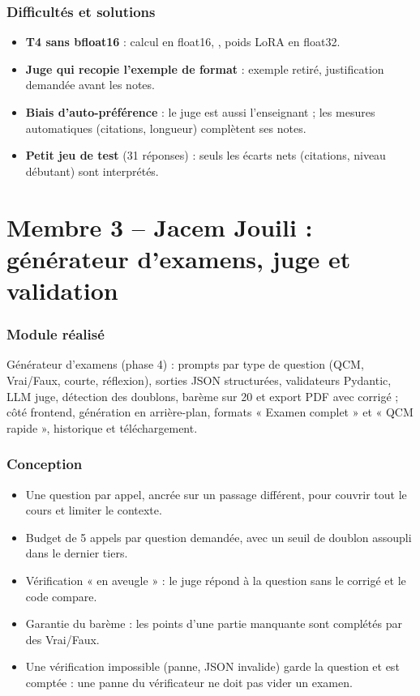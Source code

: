 \documentclass[12pt,a4paper]{report}
\newcommand{\membreTrois}{Jacem Jouili}
\DeclareRobustCommand{\code}[1]{\texttt{\codecasse{#1}}}
\begin{document}
\subsubsection{Difficultés et solutions}
\begin{itemize}
  \item \textbf{T4 sans bfloat16} : calcul en float16, \code{bf16=False}, poids LoRA en float32.
  \item \textbf{Juge qui recopie l'exemple de format} : exemple retiré, justification demandée avant les
        notes.
  \item \textbf{Biais d'auto-préférence} : le juge est aussi l'enseignant ; les mesures automatiques
        (citations, longueur) complètent ses notes.
  \item \textbf{Petit jeu de test} (31 réponses) : seuls les écarts nets (citations, niveau débutant) sont
        interprétés.
\end{itemize}

\section{Membre 3 -- \membreTrois{} : générateur d'examens, juge et validation}
\label{sec:contrib-m3}

\subsubsection{Module réalisé}
Générateur d'examens (phase 4) : prompts par type de question (QCM, Vrai/Faux, courte, réflexion),
sorties JSON structurées, validateurs Pydantic, LLM juge, détection des doublons, barème sur 20 et export
PDF avec corrigé ; côté frontend, génération en arrière-plan, formats « Examen complet » et « QCM rapide »,
historique et téléchargement.

\subsubsection{Conception}
\begin{itemize}
  \item Une question par appel, ancrée sur un passage différent, pour couvrir tout le cours et limiter le
        contexte.
  \item Budget de 5 appels par question demandée, avec un seuil de doublon assoupli dans le dernier tiers.
  \item Vérification « en aveugle » : le juge répond à la question sans le corrigé et le code compare.
  \item Garantie du barème : les points d'une partie manquante sont complétés par des Vrai/Faux.
  \item Une vérification impossible (panne, JSON invalide) garde la question et est comptée : une panne du
        vérificateur ne doit pas vider un examen.
\end{itemize}
\end{document}
